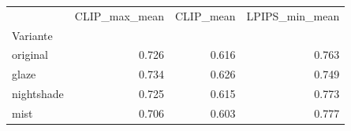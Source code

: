 \begin{tabular}{lrrr}
\toprule
 & CLIP_max_mean & CLIP_mean & LPIPS_min_mean \\
Variante &  &  &  \\
\midrule
original & 0.726 & 0.616 & 0.763 \\
glaze & 0.734 & 0.626 & 0.749 \\
nightshade & 0.725 & 0.615 & 0.773 \\
mist & 0.706 & 0.603 & 0.777 \\
\bottomrule
\end{tabular}
